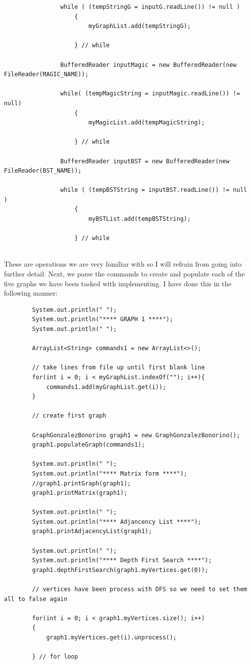 \documentclass[letterpaper, 10pt]{article}
\begin{document}
\begin{lstlisting}
				while ( (tempStringG = inputG.readLine()) != null )
					{
						myGraphList.add(tempStringG);
						
					} // while
				
				BufferedReader inputMagic = new BufferedReader(new FileReader(MAGIC_NAME));
				
				while( (tempMagicString = inputMagic.readLine()) != null) 
					{
						myMagicList.add(tempMagicString);
						
					} // while
				
				BufferedReader inputBST = new BufferedReader(new FileReader(BST_NAME));
				
				while ( (tempBSTString = inputBST.readLine()) != null )
					{
						myBSTList.add(tempBSTString);
						
					} // while
\end{lstlisting}
\\
These are operations we are very familiar with so I will refrain from going into further detail. Next, we parse the commands to create and populate each of the five graphs we have been tasked with implementing. I have done this in the following manner:
\\
\begin{lstlisting}
        System.out.println(" ");
		System.out.println("**** GRAPH 1 ****");
		System.out.println(" ");
		
		ArrayList<String> commands1 = new ArrayList<>();

        // take lines from file up until first blank line
        for(int i = 0; i < myGraphList.indexOf(""); i++){
        	commands1.add(myGraphList.get(i));
        }

        // create first graph
        
        GraphGonzalezBonorino graph1 = new GraphGonzalezBonorino();
        graph1.populateGraph(commands1);
        
        System.out.println(" ");
        System.out.println("**** Matrix form ****");
        //graph1.printGraph(graph1);
        graph1.printMatrix(graph1);
       
        System.out.println(" ");
        System.out.println("**** Adjancency List ****");
        graph1.printAdjacencyList(graph1);
    
        System.out.println(" ");
        System.out.println("**** Depth First Search ****");
        graph1.depthFirstSearch(graph1.myVertices.get(0));
        
        // vertices have been process with DFS so we need to set them all to false again
        
        for(int i = 0; i < graph1.myVertices.size(); i++)
        {
            graph1.myVertices.get(i).unprocess();
            
        } // for loop
\end{lstlisting}
\end{document}
